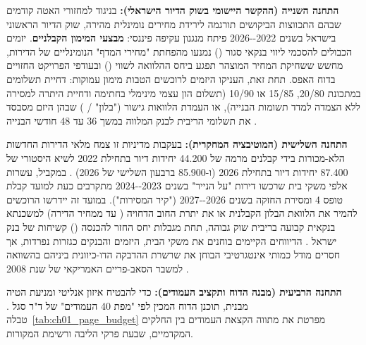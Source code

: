 \textbf{התחנה השנייה (ההקשר היישומי בשוק הדיור הישראלי):} בניגוד למחזורי האטה קודמים שבהם התכווצות הביקושים תורגמה לירידת מחירים נומינלית מהירה, שוק הדיור הראשוני בישראל בשנים \num{2022--2026} פיתח מנגנון עקיפה פיננסי: \textbf{מבצעי המימון הקבלניים}. יזמים הכבולים להסכמי ליווי בנקאי סגור () נמנעו מהפחתת "מחירי המדף" הנומינליים של הדירות, מחשש ששחיקת המחיר המוצהר תפגע ביחס ההלוואה לשווי () ובעודפי הפרויקט החזויים בדוח האפס. תחת זאת, העניקו היזמים לרוכשים הטבות מימון עמוקות: דחיית תשלומים במתכונת \num{20/80}, \num{15/85} או \num{10/90} (תשלום הון עצמי מינימלי בחתימה ודחיית היתרה למסירה ללא הצמדה למדד תשומות הבנייה), או העמדת הלוואות גישור ("בלון" / ) שבהן היזם מסבסד את תשלומי הריבית לבנק המלווה במשך \num{36} עד \num{48} חודשי הבנייה \cite{boi2025stability,mof2025economist}.

\textbf{התחנה השלישית (המוטיבציה המחקרית):} בעקבות מדיניות זו צמח מלאי הדירות החדשות הלא-מכורות בידי קבלנים מרמה של \num{44,200} יחידות דיור בתחילת \num{2022} לשיא היסטורי של \num{87,400} יחידות דיור בתחילת \num{2026} (ו-\num{85,900} ברבעון השלישי של \num{2026}) \cite{cbs2026dwellings}. במקביל, עשרות אלפי משקי בית שרכשו דירות "על הנייר" בשנים \num{2023--2024} מתקרבים כעת למועד קבלת טופס \num{4} ומסירת החזקה בשנים \num{2026--2027} ("קיר המסירות"). במועד זה יידרשו הרוכשים להמיר את הלוואת הבלון הקבלנית או את יתרת החוב הדחויה ( עד  ממחיר הדירה) למשכנתא בנקאית קבועה בריבית שוק גבוהה, תחת מגבלות יחס החזר להכנסה () קשיחות של בנק ישראל \cite{boi2025directive}. הדיווחים הקיימים בוחנים את משקי הבית, היזמים והבנקים כגזרות נפרדות, אך חסרים מודל כמותי אינטגרטיבי הבוחן את שרשרת ההדבקה הדו-כיוונית ביניהם בהשוואה למשבר הסאב-פריים האמריקאי של שנת \num{2008} \cite{mian2009consequences,mayer2009rise}.

\textbf{התחנה הרביעית (מבנה הדוח ותקציב העמודים):} כדי להבטיח איזון אנליטי ומניעת הטיה מבנית, תוכנן הדוח המכין לפי "מפת \num{40} העמודים" של ד"ר סגל \cite{segal2026prep,segal2026l03}. טבלה~\ref{tab:ch01_page_budget} מפרטת את מתווה הקצאת העמודים בין החלקים המקדמיים, שבעת פרקי הליבה ורשימת המקורות.


